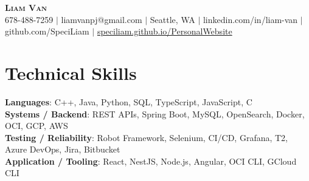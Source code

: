 \documentclass[letterpaper,11pt]{article}
\begin{document}

%
\begin{center}
    \textbf{\Huge \scshape Liam Van} \\ \vspace{1pt}
    \small 678-488-7259 $|$ \small {liamvanpj@gmail.com} $|$ Seattle, WA
 {{$|$ linkedin.com/in/liam-van} {$|$ github.com/SpeciLiam} {$|$ \href{https://speciliam.github.io/PersonalWebsite}{speciliam.github.io/PersonalWebsite}}}

\end{center}

\section{Technical Skills}
 \begin{itemize}[leftmargin=0.15in, label={}]
    \small{\item{
     \textbf{Languages}{: C++, Java, Python, SQL, TypeScript, JavaScript, C} \\
     \textbf{Systems / Backend}{: REST APIs, Spring Boot, MySQL, OpenSearch, Docker, OCI, GCP, AWS} \\
     \textbf{Testing / Reliability}{: Robot Framework, Selenium, CI/CD, Grafana, T2, Azure DevOps, Jira, Bitbucket} \\
     \textbf{Application / Tooling}{: React, NestJS, Node.js, Angular, OCI CLI, GCloud CLI} \\
    }}
 \end{itemize}
%
\end{document}
